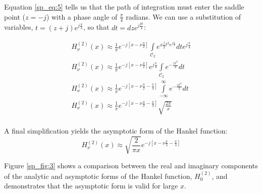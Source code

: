 Equation \ref{sp_eq:5} tells us that the path of integration must enter the saddle point ($z=-j$) with a phase angle of $\frac{\pi}{4}$ radians. We can use a substitution of variables, $t=(z+j)e^{j\frac{\pi}{4}}$, so that $dt = dze^{j\frac{pi}{4}}$:

\begin{equation}
  \begin{gathered}
    H_{\nu}^{(2)}(x) \approx \frac{1}{\pi}e^{-j\left[x - \nu\frac{\pi}{2}\right]}\int\limits_{\mathcal{C}_2}e^{x\frac{j}{2}t^2e^{j\frac{\pi}{2}}} dte^{j\frac{\pi}{4}} \\
    H_{\nu}^{(2)}(x) \approx \frac{1}{\pi}e^{-j\left[x - \nu\frac{\pi}{2}\right]}e^{j\frac{\pi}{4}}\int\limits_{\mathcal{C}_2}e^{-\frac{xt^2}{2}} dt \\
     H_{\nu}^{(2)}(x) \approx  \frac{1}{\pi}e^{-j\left[x - \nu\frac{\pi}{2} - \frac{\pi}{4}\right]}\int\limits_{-\infty}^{\infty}e^{-\frac{xt^2}{2}} dt \\
    H_{\nu}^{(2)}(x) \approx \frac{1}{\pi}e^{-j\left[x - \nu\frac{\pi}{2} - \frac{\pi}{4}\right]}\sqrt{\frac{2\pi}{x}}\\
    \end{gathered}
  \label{sp_eq:6}
  \end{equation}
\renewcommand{\baselinestretch}{2} \small\normalsize

\noindent A final simplification yields the asymptotic form of the Hankel function:
\begin{equation}
    \boxed{H_{\nu}^{(2)}(x) \approx \sqrt{\frac{2}{\pi x}}e^{-j\left[x - \nu\frac{\pi}{2} - \frac{\pi}{4}\right]}}
  \label{sp_eq:7}
  \end{equation}
\renewcommand{\baselinestretch}{2} \small\normalsize

Figure \ref{sp_fig:3} shows a comparison between the real and imaginary components of the analytic and asymptotic forms of the Hankel function, $H_0^{(2)}$, and demonstrates that the asymptotic form is valid for large $x$.

